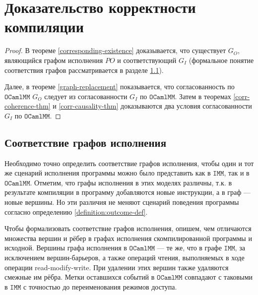 \documentclass[14pt]{matmex-diploma-custom}
\newcommand{\IMM}{\mathtt{IMM}}
\newcommand{\OMM}{\mathtt{OCaml}\allowbreak \mathtt{MM}}
\newcommand{\todo}[1]{\textbf{\Large \textcolor{red}{#1}}}
\begin{document}
\section{Доказательство корректности компиляции}
\label{proof}
\compiletheorem*
\begin{proof}
  В теореме \ref{corresponding-existence} доказывается, что существует $G_O$, являющийся графом исполнения $PO$ и соответствующий $G_I$ (формальное понятие соответствия графов рассматривается в разделе \ref{graph-correspondence}).
  
  Далее, в теореме \ref{graph-replacement} показывается, что согласованность по $\OMM$ $G_O$ следует из согласованности $G_I$ по $\OMM$. Затем в теоремах \ref{corr-coherence-thm} и \ref{corr-causality-thm} доказываются два условия согласованности $G_I$ по $\OMM$. 
\end{proof}



\subsection{Соответствие графов исполнения}
\label{graph-correspondence}

Необходимо точно определить соответствие графов исполнения, чтобы один и тот же сценарий исполнения программы можно было представить как в $\IMM$, так и в $\OMM$. Отметим, что графы исполнения в этих моделях различны, т.к. в результате компиляции в программу добавляются новые инструкции, а в граф --- новые вершины. Но эти различия не меняют сценарий поведения программы согласно определению \ref{definition:outcome-def}. 

Чтобы формализовать соответствие графов исполнения, опишем, чем отличаются множества вершин и рёбер в графах исполнения скомпилированной программы и исходной. Вершины графа исполнения в $\OMM$ --- те же, что в графе $\IMM$, за исключением вершин-барьеров, а также операций чтения, выполняемых в ходе операции read-modify-write. При удалении этих вершин также удаляются смежные им рёбра. Метки оставшихся событий в $\OMM$ совпадают с таковыми в $\IMM$ с точностью до переименования режимов доступа. 
\end{document}

